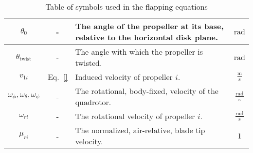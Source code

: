 \begin{table}
\begin{tabularx}{\tablewidth}{|c|c|X|c|}
            $\theta_{0}$ & - & The angle of the propeller at its base, relative to the horizontal disk plane. & $\text{rad}$ \\\hline
            $\theta_{\text{twist}}$ & - & The angle with which the propeller is twisted.  & $\text{rad}$ \\\hline
            $v_{1i}$ & Eq.~\eqref{} & Induced velocity of propeller $i$. & $\frac{\text{m}}{\text{s}}$ \\\hline
            $\omega_{\phi},\omega_{\theta},\omega_{\psi}$ & - & The rotational, body-fixed, velocity of the quadrotor. & $\frac{\text{rad}}{\text{s}}$ \\\hline
            $\omega_{ri}$ & - & The rotational velocity of propeller $i$. & $\frac{\text{rad}}{\text{s}}$ \\\hline
            $\mu_{ri}$ & - & The normalized, air-relative, blade tip velocity. & $1$ \\\hline
        \end{tabularx}
        \label{tbl:observer:flapping:symbols}
        \caption{Table of symbols used in the flapping equations}
    \end{table}
